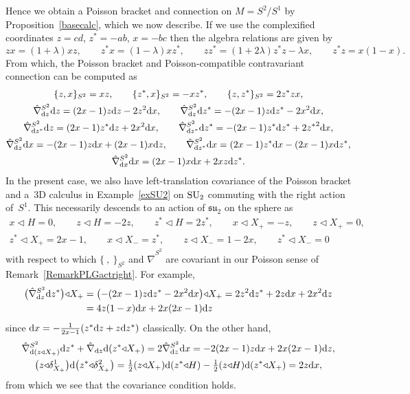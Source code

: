 \documentclass[pdftex]{sigma}
\numberwithin{equation}{section}
\newcommand{\<}{{\langle}}
\renewcommand{\>}{{\rangle}}
\newcommand{\extd}{{\rm d}}
\newcommand{\ra}{{\triangleleft}}
\begin{document}
\begin{Example}
Hence we obtain a Poisson bracket and connection on $M=S^2/S^1$ by Proposition~\ref{basecalc}, which we now describe. If we use the complexified coordinates $z=cd$, $z^*=-ab$, $x=-bc$ then the algebra relations are given by
\[ zx=(1+\lambda)xz, \qquad z^*x=(1-\lambda)xz^*, \qquad zz^*=(1+2\lambda)z^*z-\lambda x, \qquad z^*z=x(1-x).\]
From which, the Poisson bracket and Poisson-compatible contravariant connection can be computed as
\begin{gather*}
 \{ z,x \}_{S^2}=xz, \qquad \{ z^*,x \}_{S^2}=-xz^*, \qquad \{ z,z^* \}_{S^2}=2z^*zx, \\
\hat\nabla^{S^2}_{\extd z}\extd z=(2x-1)z\extd z-2z^2\extd x, \qquad \hat\nabla^{S^2}_{\extd z}\extd z^*=-(2x-1)z\extd z^*-2x^2\extd x,\\
\hat\nabla^{S^2}_{\extd z^*}\extd z=(2x-1)z^*\extd z+2x^2\extd x, \qquad \hat\nabla^{S^2}_{\extd z^*}\extd z^*=-(2x-1)z^*\extd z^*+2{z^*}^2\extd x, \\
 \hat\nabla^{S^2}_{\extd z}\extd x=-(2x-1)z\extd x+(2x-1)x\extd z, \qquad \hat\nabla^{S^2}_{\extd z^*}\extd x=(2x-1)z^*\extd x-(2x-1)x\extd z^*,\\
 \hat\nabla^{S^2}_{\extd x}\extd x=(2x-1)x\extd x+2xz\extd z^*.\end{gather*}
In the present case, we also have left-translation covariance of the Poisson bracket and a~3D calculus in Example~\ref{exSU2} on ${\rm SU}_2$ commuting with the right action of~$S^1$. This necessarily descends to an action of ${\mathfrak{su}}_2$ on the sphere as
\begin{gather*} x\ra H=0, \qquad z\ra H= -2z, \qquad z^*\ra H=2z^*,\qquad x\ra X_+=-z,\qquad z\ra X_+= 0,\\
z^*\ra X_+=2x-1,\qquad x\ra X_-=z^*, \qquad z\ra X_-=1-2x, \qquad z^*\ra X_-=0\end{gather*}
with respect to which $\{\ ,\ \}_{S^2}$ and $\hat\nabla^{S^2}$ are covariant in our Poisson sense of Remark~\ref{RemarkPLGactright}. For example,
\begin{align*} \big(\hat\nabla^{S^2}_{\extd z}\extd z^*\big)\ra X_+&=\big({-}(2x-1)z\extd z^*-2x^2\extd x\big)\ra X_+=2z^2\extd z^*+2z\extd x+2x^2\extd z\\
&=4z(1-x)\extd x+2x(2x-1)\extd z\end{align*}
since $\extd x=-{1\over{2x-1}}(z^*\extd z+z\extd z^*)$ classically. On the other hand,
\begin{gather*} \hat\nabla^{S^2}_{\extd(z\ra X_+)}\extd z^* +\hat\nabla_{\extd z}\extd(z^*\ra X_+)=2\hat\nabla^{S^2}_{\extd z}\extd x=-2(2x-1)z\extd x+2x(2x-1)\extd z, \\
 \big(z\ra\delta^1_{X_+}\big) \extd\big(z^*\ra\delta^2_{X_+}\big)=\tfrac{1}{2} (z\ra X_+)\extd(z^*\ra H)-\tfrac{1}{2} (z\ra H)\extd(z^*\ra X_+)=2z\extd x, \end{gather*}
from which we see that the covariance condition holds.
\end{Example}
\end{document}
